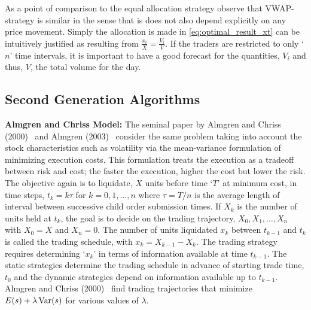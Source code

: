 As a point of comparison to the equal allocation strategy observe that VWAP-strategy is similar in the sense that is does not also depend explicitly on any price movement. Simply the allocation is made in \eqref{eq:optimal_result_xt} can be intuitively justified as resulting from $\frac{x_i}{X}= \frac{V_i}{V}$. If the traders are restricted to only `$n$' time intervals, it is important to have a good forecast for the quantities, $V_i$ and thus, $V$, the total volume for the day. 


\subsection{Second Generation Algorithms\label{subsec:almchrmodel}}

\noindent\textbf{Almgren and Chriss Model:}\label{in:alm_chriss} The seminal paper by Almgren and Chriss (2000)~\cite{alm2000} and Almgren (2003)~\cite{almgren2003} consider the same problem taking into account the stock characteristics such as volatility via the mean-variance formulation of minimizing execution costs. This formulation treats the execution as a tradeoff between risk and cost; the faster the execution, higher the cost but lower the risk. The objective again is to liquidate, $X$ units before time `$T$' at minimum cost, in time steps, $t_k = k \tau$ for $k = 0,1,\ldots, n$ where $\tau = T/n$ is the average length of interval between successive child order submission times. If $X_k$ is the number of units held at $t_k$, the goal is to decide on the trading trajectory, $X_0, X_1, \ldots, X_n$ with $X_0=X$ and $X_n=0$. The number of units liquidated $x_k$ between $t_{k-1}$ and $t_k$ is called the trading schedule, with $x_k = X_{k-1} - X_k$. The trading strategy requires determining `$x_k$' in terms of information available at time $t_{k-1}$. The static strategies determine the trading schedule in advance of starting trade time, $t_0$ and the dynamic strategies depend on information available up to $t_{k-1}$. Almgren and Chriss (2000)~\cite{alm2000} find trading trajectories that minimize $E(s)+\lambda \operatorname{Var}(s)$ for various values of $\lambda$.


